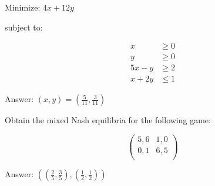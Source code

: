 \documentclass{article}
\begin{document}
\hrulefill
\begin{multicols}{2}

    Minimize: \(4x + 12 y\)

    subject to:

    \begin{align*}
        x & \geq 0\\
        y & \geq 0\\
        5 x - y &\geq 2\\
        x + 2y &\leq 1
    \end{align*}
    

    \columnbreak

    Answer: \( (x, y) = \left(\frac{5}{11}, \frac{3}{11}\right) \)

\end{multicols}

\hrulefill
\begin{multicols}{2}

    Obtain the mixed Nash equilibria for the following game:

    \[
        \begin{pmatrix}
            5, 6 & 1, 0\\
            0, 1 & 6, 5\\
        \end{pmatrix}
    \]

    \columnbreak

    Answer: \( \left(\left(\frac{2}{5}, \frac{3}{5}\right), \left(\frac{1}{2}, \frac{1}{2}\right)\right) \)

\end{multicols}
\end{document}
